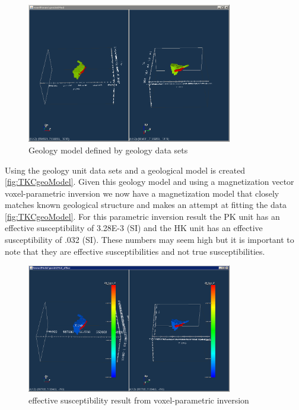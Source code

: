 \begin{figure} [h]
   \centering
   \includegraphics[width=0.8\textwidth]{images/TKC/TKCgeoModel.PNG}
   \caption{Geology model defined by geology data sets}
   \label{fig:TKCgeoModel}
\end{figure}

Using the geology unit data sets and a geological model is created \autoref{fig:TKCgeoModel}. Given this geology model and using a magnetization vector voxel-parametric inversion we now have a magnetization model that closely matches known geological structure and makes an attempt at fitting the data \autoref{fig:TKCgeoModel}. For this parametric inversion result the PK unit has an effective susceptibility of 3.28E-3 (SI) and the HK unit has an effective susceptibility of .032 (SI). These numbers may seem high but it is important to note that they are effective susceptibilities and not true susceptibilities. 

\begin{figure} [h]
   \centering
   \includegraphics[width=0.8\textwidth]{images/TKC/TKCsuscModel.PNG}
   \caption{effective susceptibility result from voxel-parametric inversion}
   \label{fig:TKCsuscModel}
\end{figure}


